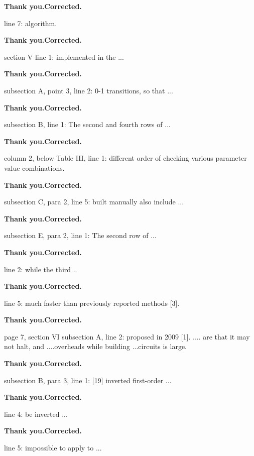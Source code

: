 \documentclass[journal]{IEEEtran}
\begin{document}
{\smallskip
\textbf{Thank you.Corrected.}
\smallskip

                           line 7: algorithm.

\smallskip
\textbf{Thank you.Corrected.}
\smallskip

section V
line 1: implemented in the ...

\smallskip
\textbf{Thank you.Corrected.}
\smallskip

subsection A, point 3, line 2: 0-1 transitions, so that ...

\smallskip
\textbf{Thank you.Corrected.}
\smallskip

subsection B, line 1: The second and fourth rows of ...

\smallskip
\textbf{Thank you.Corrected.}
\smallskip

column 2, below Table III, line 1: different order of checking various parameter value combinations.

\smallskip
\textbf{Thank you.Corrected.}
\smallskip

subsection C, para 2, line 5: built manually also include ...

\smallskip
\textbf{Thank you.Corrected.}
\smallskip

subsection E, para 2, line 1: The second row of ...

\smallskip
\textbf{Thank you.Corrected.}
\smallskip

                                       line 2: while the third ..

\smallskip
\textbf{Thank you.Corrected.}
\smallskip

                                       line 5: much faster than previously reported methods [3].

\smallskip
\textbf{Thank you.Corrected.}
\smallskip

page 7, section VI
subsection A, line 2: proposed in 2009 [1]. .... are that it may not halt, and ....overheads while building ...circuits is large.

\smallskip
\textbf{Thank you.Corrected.}
\smallskip

subsection B, para 3, line 1: [19] inverted first-order ...

\smallskip
\textbf{Thank you.Corrected.}
\smallskip

                                       line 4: be inverted ...

\smallskip
\textbf{Thank you.Corrected.}
\smallskip

                                       line 5: impossible to apply to ...

}
\end{document}

